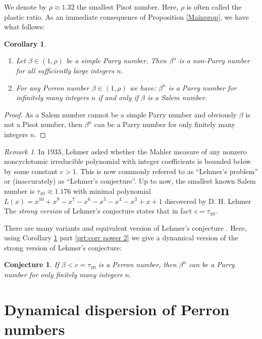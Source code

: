 \documentclass[12pt]{article}
\theoremstyle{plain}
\newtheorem{corollary}[theorem]{Corollary}
\newtheorem{conj}[theorem]{Conjecture}
\theoremstyle{remark}
\newtheorem{remark}[theorem]{Remark}
\begin{document}
 We denote by $\rho\approx 1.32$ the smallest Pisot number. Here, $\rho$ is often called the plastic ratio.
As an immediate consequence of Proposition \ref{Mainprop}, we have what follows:
\begin{corollary}{\ }
 \label{corr power}
 \begin{enumerate}
 \item Let $\beta \in (1,\rho)$ be a simple Parry number. Then $\beta^n$ is a non-Parry number for all sufficiently large integers $n$.  \label{prt:corr power 1}
 \item For any Perron number $\beta \in (1,\rho) $ we have: $\beta^n$ is a Parry number for infinitely many integers $n$ if and only if $\beta $ is a Salem number. \label{prt:corr power 2}
 \end{enumerate}
\end{corollary}

\begin{proof}
 As a Salem number cannot be a simple Parry number \cite{Boy89} and obviously $\beta $ is not a Pisot number, then $\beta^n $ can be a Parry number for only finitely many integers $n$. 
\end{proof}

\begin{remark}
 In 1933, Lehmer asked whether the Mahler measure of any nonzero noncyclotomic irreducible polynomial with integer coefficients is bounded below
by some constant $c > 1$. This is now commonly referred to as ``Lehmer’s
problem'' or (inaccurately) as ``Lehmer’s conjecture''. Up to now, the smallest known Salem number is $\tau_{10}\approx 1.176$ with minimal polynomial $L(x)=x^{10}+x^9-x^7-x^6-x^5-x^4-x^3+x+1$ discovered by D. H. Lehmer \cite{Leh33} The \emph{strong version} of Lehmer's conjecture states
that in fact \(c=\tau_{10}\). 

There are many variants and equivalent version of Lehmer's conjecture \cite{VergerGaugry2019}. Here, using Corollary \ref{corr power} part \ref{prt:corr power 2} we give a dynamical version of the strong version of Lehmer's conjecture:
\end{remark}
\begin{conj}
 If $\beta < c = \tau_{10}$ is a Perron number, then $\beta^n$ can be a Parry number for only finitely many integers $n$. 
\end{conj}

\section{Dynamical dispersion of Perron numbers}
\label{sec:2}
\end{document}
